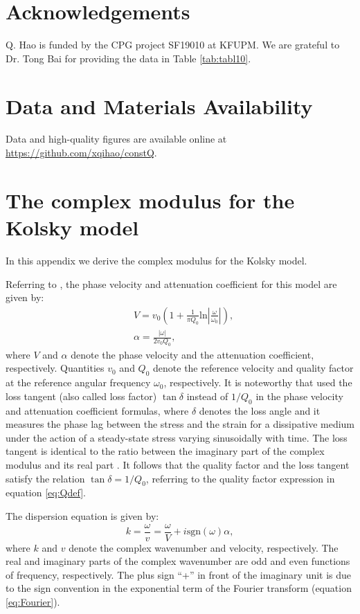 \documentclass[article]{./macros/elsarticle_qh}
\begin{document}
\section{Acknowledgements}
Q. Hao is funded by the CPG project SF19010 at KFUPM. We are grateful to Dr. Tong Bai for providing the data in Table \ref{tab:tabl10}.

\section{Data and Materials Availability}
Data and high-quality figures are available online at \url{https://github.com/xqihao/constQ}.

\appendix
\section{The complex modulus for the Kolsky model} 
In this appendix we derive the complex modulus for the Kolsky model. 

Referring to \cite{kolsky:1956}, the phase velocity and attenuation coefficient for this model are given by:
\begin{align} 
\label{eq:V}
& V = v_{0} \left( 1 + \frac{1}{\pi Q_{0}} 
\text{ln} \left| 
\frac{\omega}{\omega_{0}} 
\right| \right) , \\
\label{eq:alpha}
& \alpha = \frac{|\omega|}{2v_{0} Q_{0}} ,
\end{align}
where $V$ and $\alpha$ denote the phase velocity and the attenuation coefficient, respectively. Quantities $v_{0}$ and $Q_{0}$ denote the reference velocity and quality factor at the reference angular frequency $\omega_{0}$, respectively. It is noteworthy that \cite{kolsky:1956} used the loss tangent (also called loss factor) $\tan \delta$ instead of $1/Q_{0}$ in the phase velocity and attenuation coefficient formulas, where $\delta$ denotes the loss angle and it measures the phase lag between the stress and the strain for a dissipative medium under the action of a steady-state stress varying sinusoidally with time. The loss tangent is identical to the ratio between the imaginary part of the complex modulus and its real part \cite[]{lakes:2009}. It follows that the quality factor and the loss tangent satisfy the relation $\tan \delta = 1/Q_{0}$, referring to the quality factor expression in equation \ref{eq:Qdef}.   

The dispersion equation is given by:
\begin{equation} \label{eq:k}
k = \frac{\omega}{v} = \frac{\omega}{V} + i \text{sgn}(\omega) \alpha,
\end{equation}
where $k$ and $v$ denote the complex wavenumber and velocity, respectively. The real and imaginary parts of the complex wavenumber are odd and even functions of frequency, respectively. The plus sign ``+'' in front of the imaginary unit is due to the sign convention in the exponential term of the Fourier transform (equation \ref{eq:Fourier}).
\end{document}

